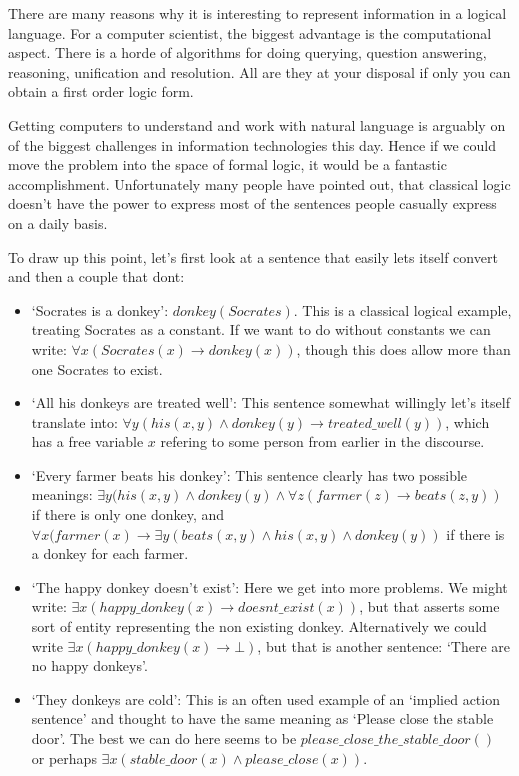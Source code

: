 \documentclass[12pt]{article}
\begin{document}
There are many reasons why it is interesting to represent information in a logical language. For a computer scientist, the biggest advantage is the computational aspect. There is a horde of algorithms for doing querying, question answering, reasoning, unification and resolution. All are they at your disposal if only you can obtain a first order logic form.

Getting computers to understand and work with natural language is arguably on of the biggest challenges in information technologies this day. Hence if we could move the problem into the space of formal logic, it would be a fantastic accomplishment. Unfortunately many people have pointed out, that classical logic doesn't have the power to express most of the sentences people casually express on a daily basis.

To draw up this point, let's first look at a sentence that easily lets itself convert and then a couple that dont:
\begin{itemize}
\item `Socrates is a donkey': $donkey(Socrates)$. This is a classical logical example, treating Socrates as a constant. If we want to do without constants we can write: $\forall x(Socrates(x)\rightarrow donkey(x))$, though this does allow more than one Socrates to exist.
\item `All his donkeys are treated well': This sentence somewhat willingly let's itself translate into: $\forall y(his(x,y)\wedge donkey(y) \rightarrow treated\_well(y))$, which has a free variable $x$ refering to some person from earlier in the discourse.
\item `Every farmer beats his donkey': This sentence clearly has two possible meanings: $\exists y(his(x,y)\wedge donkey(y)\wedge \forall z(farmer(z) \rightarrow beats(z,y))$ if there is only one donkey, and $\forall x(farmer(x)\rightarrow \exists y (beats(x,y)\wedge his(x,y)\wedge donkey(y))$ if there is a donkey for each farmer.
\item `The happy donkey doesn't exist': Here we get into more problems. We might write: $\exists x(happy\_donkey(x)\rightarrow doesnt\_exist(x))$, but that asserts some sort of entity representing the non existing donkey. Alternatively we could write $\exists x(happy\_donkey(x)\rightarrow \bot)$, but that is another sentence: `There are no happy donkeys'.
\item `They donkeys are cold': This is an often used example of an `implied action sentence' and thought to have the same meaning as `Please close the stable door'. The best we can do here seems to be $please\_close\_the\_stable\_door()$ or perhaps $\exists x(stable\_door(x)\wedge please\_close(x))$.
\end{itemize}
\end{document}
